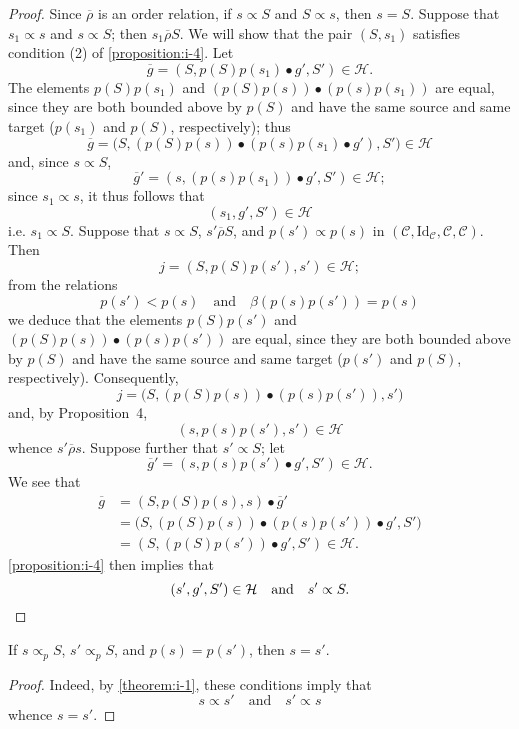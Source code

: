 \documentclass[a4paper,fleqn]{article}
\theoremstyle{plain}
\newenvironment{corollary}[1]
  {\renewcommand\theinnercorollary{#1}\innercorollary}
  {\endinnercorollary}
\theoremstyle{definition}
\newcommand{\oldpage}[1]{{\marginpar{\footnotesize$\bigg\vert$\,\,\,\,\textit{p.~#1}}}}
\newcommand{\textand}{\quad\text{and}\quad}
\newcommand{\CC}{\mathcal{C}}
\newcommand{\HH}{\mathcal{H}}
\newcommand{\relrhobar}{\mathrel{\overline{\rho}}}
\newcommand{\subs}{\mathrel{\propto}}
\newcommand{\Id}{\mathrm{Id}}
\newcommand{\smallbullet}{\bullet}
\begin{document}
\begin{proof}
  Since $\relrhobar$ is an order relation, if $s\subs S$ and $S\subs s$, then $s=S$.
  Suppose that $s_1\subs s$ and $s\subs S$;
  then $s_1\relrhobar S$.
  We will show that the pair $(S,s_1)$ satisfies condition (2\textquotesingle) of \cref{proposition:i-4}.
  Let
  \[
    \overline{g}
    = (S,p(S)p(s_1)\smallbullet g',S')
    \in\HH.
  \]
  The elements $p(S)p(s_1)$ and $(p(S)p(s))\smallbullet(p(s)p(s_1))$ are equal, since they are both bounded above by $p(S)$ and have the same source and same target ($p(s_1)$ and $p(S)$, respectively);
  thus
  \[
    \overline{g}
    = \big(S,(p(S)p(s))\smallbullet(p(s)p(s_1)\smallbullet g'),S'\big)
    \in\HH
  \]
  and, since $s\subs S$,
  \[
    \overline{g}'
    = (s,(p(s)p(s_1))\smallbullet g', S')
    \in\HH;
  \]
  since $s_1\subs s$, it thus follows that
  \[
    (s_1,g',S')
    \in\HH
  \]
  i.e. $s_1\subs S$.
  Suppose that $s\subs S$, $s'\relrhobar S$, and $p(s')\subs p(s)$ in $(\CC,\Id_\CC,\CC,\CC)$.
  Then
  \[
    j
    = (S,p(S)p(s'),s')
    \in\HH;
  \]
  from the relations
  \[
    p(s') < p(s)
    \textand
    \beta(p(s)p(s')) = p(s)
  \]
  we deduce that the elements $p(S)p(s')$ and $(p(S)p(s))\smallbullet(p(s)p(s'))$ are equal, since they are both bounded above by $p(S)$ and have the same source and same target ($p(s')$ and $p(S)$, respectively).
  Consequently,
  \[
    j
    = \big(S,(p(S)p(s))\smallbullet(p(s)p(s')),s'\big)
  \]
  and, by Proposition~4,
  \[
    (s,p(s)p(s'),s')
    \in\HH
  \]
  whence $s'\relrhobar s$.
  Suppose further that $s'\subs S$;
  let
  \[
    \overline{g}'
    = (s,p(s)p(s')\smallbullet g',S')
    \in\HH.
  \]
  We see that
  \[
    \begin{aligned}
      \overline{g}
      &= (S,p(S)p(s),s)\smallbullet\overline{g}'
    \\&= \big(S,(p(S)p(s))\smallbullet(p(s)p(s'))\smallbullet g',S'\big)
    \\&= (S,(p(S)p(s'))\smallbullet g',S')
    \in\HH.
    \end{aligned}
  \]
  \oldpage{363}
  \cref{proposition:i-4} then implies that
  \[
    (s',g',S')\in\HH
    \textand
    s'\subs S.
    \qedhere
  \]
\end{proof}

\begin{corollary}{1}
  If $s\subs_p S$, $s'\subs_p S$, and $p(s)=p(s')$, then $s=s'$.
\end{corollary}

\begin{proof}
  Indeed, by \cref{theorem:i-1}, these conditions imply that
  \[
    s\subs s'
    \textand
    s'\subs s
  \]
  whence $s=s'$.
\end{proof}
\end{document}

